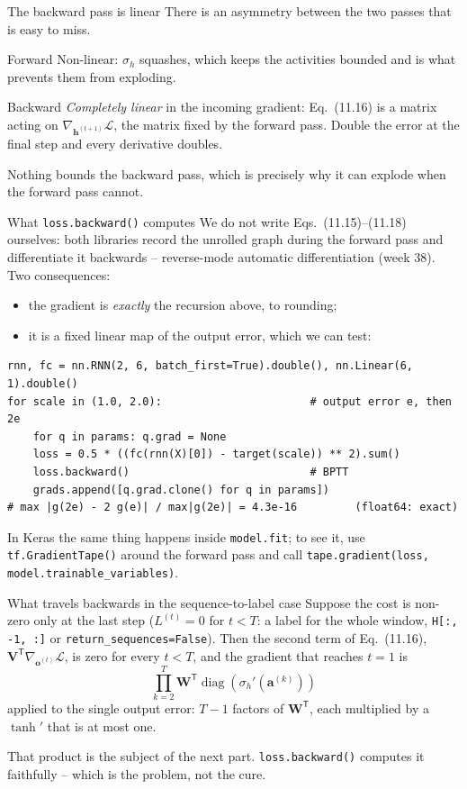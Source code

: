 \documentclass[10pt,aspectratio=169]{beamer}
\begin{document}
\begin{frame}{The backward pass is linear}
There is an asymmetry between the two passes that is easy to miss.
\begin{block}{Forward}
Non-linear: $\sigma_h$ squashes, which keeps the activities bounded and is
what prevents them from exploding.
\end{block}
\begin{block}{Backward}
\emph{Completely linear} in the incoming gradient: Eq.~(11.16) is a matrix
acting on $\nabla_{\bm{h}^{(t+1)}}\mathcal{L}$, the matrix fixed by the
forward pass.  Double the error at the final step and every derivative
doubles.
\end{block}
\medskip
Nothing bounds the backward pass, which is precisely why it can explode
when the forward pass cannot.
\end{frame}

\begin{frame}[fragile]{What \texttt{loss.backward()} computes}
We do not write Eqs.~(11.15)--(11.18) ourselves: both libraries record the
unrolled graph during the forward pass and differentiate it backwards --
reverse-mode automatic differentiation (week 38).  Two consequences:
\begin{itemize}
  \item the gradient is \emph{exactly} the recursion above, to rounding;
  \item it is a fixed linear map of the output error, which we can test:
\end{itemize}
\begin{lstlisting}
rnn, fc = nn.RNN(2, 6, batch_first=True).double(), nn.Linear(6, 1).double()
for scale in (1.0, 2.0):                       # output error e, then 2e
    for q in params: q.grad = None
    loss = 0.5 * ((fc(rnn(X)[0]) - target(scale)) ** 2).sum()
    loss.backward()                            # BPTT
    grads.append([q.grad.clone() for q in params])
# max |g(2e) - 2 g(e)| / max|g(2e)| = 4.3e-16         (float64: exact)
\end{lstlisting}
\small In Keras the same thing happens inside \texttt{model.fit}; to see it,
use \texttt{tf.GradientTape()} around the forward pass and call
\texttt{tape.gradient(loss, model.trainable\_variables)}.
\end{frame}

\begin{frame}{What travels backwards in the sequence-to-label case}
Suppose the cost is non-zero only at the last step ($L^{(t)}=0$ for $t<T$:
a label for the whole window, \texttt{H[:, -1, :]} or
\texttt{return\_sequences=False}).  Then the second term of Eq.~(11.16),
$\bm{V}^{\mathsf{T}}\nabla_{\bm{o}^{(t)}}\mathcal{L}$, is zero for every
$t<T$, and the gradient that reaches $t=1$ is
\[
  \prod_{k=2}^{T}\bm{W}^{\mathsf{T}}\operatorname{diag}\!\left(\sigma_h'(\bm{a}^{(k)})\right)
\]
applied to the single output error: $T-1$ factors of $\bm{W}^{\mathsf{T}}$,
each multiplied by a $\tanh'$ that is at most one.

\medskip
That product is the subject of the next part.  \texttt{loss.backward()}
computes it faithfully -- which is the problem, not the cure.
\end{frame}
\end{document}
